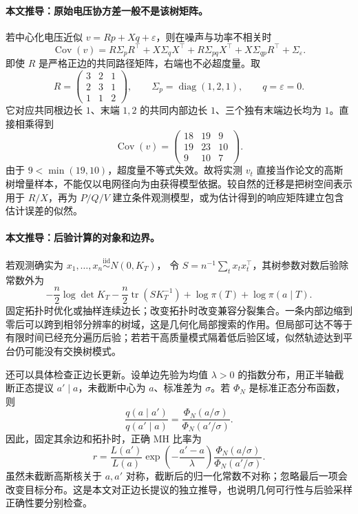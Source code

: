 \documentclass[UTF8,11pt,fontset=fandol]{ctexart}
\theoremstyle{remark}
\numberwithin{equation}{section}
\begin{document}
\paragraph{本文推导：原始电压协方差一般不是该树矩阵。}
若中心化电压近似 $v=Rp+Xq+\varepsilon$，则在噪声与功率不相关时
\[
 \operatorname{Cov}(v)
 =R\Sigma_pR^\top+X\Sigma_qX^\top
  +R\Sigma_{pq}X^\top+X\Sigma_{qp}R^\top+\Sigma_\varepsilon.
\]
即使 $R$ 是严格正边的共同路径矩阵，右端也不必超度量。取
\[
 R=\begin{pmatrix}3&2&1\\2&3&1\\1&1&2\end{pmatrix},
 \qquad
 \Sigma_p=\operatorname{diag}(1,2,1),\qquad q=\varepsilon=0.
\]
它对应共同根边长 $1$、末端 $1,2$ 的共同内部边长 $1$、三个独有末端边长均为 $1$。直接相乘得到
\[
 \operatorname{Cov}(v)
 =\begin{pmatrix}18&19&9\\19&23&10\\9&10&7\end{pmatrix}.
\]
由于 $9<\min(19,10)$，超度量不等式失效。故将实测 $v_t$ 直接当作论文的高斯树增量样本，不能仅以电网径向为由获得模型依据。较自然的迁移是把树空间表示用于 $R/X$，再为 $P/Q/V$ 建立条件观测模型，或为估计得到的响应矩阵建立包含估计误差的似然。

\paragraph{本文推导：后验计算的对象和边界。}
若观测确实为 $x_1,\ldots,x_n\stackrel{\mathrm{iid}}{\sim}N(0,K_T)$，
令 $S=n^{-1}\sum_tx_tx_t^\top$，其树参数对数后验除常数外为
\[
 -\frac n2\log\det K_T
 -\frac n2\operatorname{tr}(SK_T^{-1})
 +\log\pi(T)+\log\pi(a\mid T).
\]
固定拓扑时优化或抽样连续边长；改变拓扑时改变兼容分裂集合。一条内部边缩到零后可以跨到相邻分辨率的树域，这是几何化局部搜索的作用。但局部可达不等于有限时间已经充分遍历后验；若若干高质量模式隔着低后验区域，似然轨迹达到平台仍可能没有交换树模式。

还可以具体检查正边长更新。设单边先验为均值 $\lambda>0$ 的指数分布，用正半轴截断正态提议 $a'\mid a$，未截断中心为 $a$、标准差为 $\sigma$。若 $\Phi_N$ 是标准正态分布函数，则
\[
 \frac{q(a\mid a')}{q(a'\mid a)}
 =\frac{\Phi_N(a/\sigma)}{\Phi_N(a'/\sigma)}.
\]
因此，固定其余边和拓扑时，正确 MH 比率为
\[
 r=\frac{L(a')}{L(a)}
       \exp\!\left(-\frac{a'-a}{\lambda}\right)
       \frac{\Phi_N(a/\sigma)}{\Phi_N(a'/\sigma)}.
\]
虽然未截断高斯核关于 $a,a'$ 对称，截断后的归一化常数不对称；忽略最后一项会改变目标分布。这是本文对正边长提议的独立推导，也说明几何可行性与后验采样正确性要分别检查。
\end{document}

